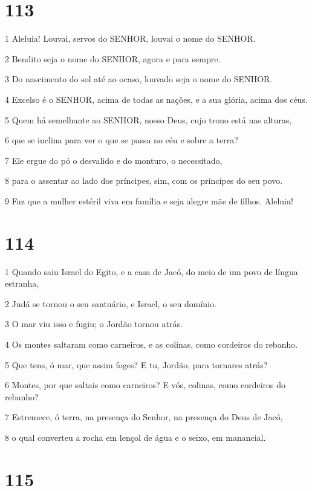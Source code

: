 \chapter{113}

\par 1 Aleluia! Louvai, servos do SENHOR, louvai o nome do SENHOR.
\par 2 Bendito seja o nome do SENHOR, agora e para sempre.
\par 3 Do nascimento do sol até ao ocaso, louvado seja o nome do SENHOR.
\par 4 Excelso é o SENHOR, acima de todas as nações, e a sua glória, acima dos céus.
\par 5 Quem há semelhante ao SENHOR, nosso Deus, cujo trono está nas alturas,
\par 6 que se inclina para ver o que se passa no céu e sobre a terra?
\par 7 Ele ergue do pó o desvalido e do monturo, o necessitado,
\par 8 para o assentar ao lado dos príncipes, sim, com os príncipes do seu povo.
\par 9 Faz que a mulher estéril viva em família e seja alegre mãe de filhos. Aleluia!

\chapter{114}

\par 1 Quando saiu Israel do Egito, e a casa de Jacó, do meio de um povo de língua estranha,
\par 2 Judá se tornou o seu santuário, e Israel, o seu domínio.
\par 3 O mar viu isso e fugiu; o Jordão tornou atrás.
\par 4 Os montes saltaram como carneiros, e as colinas, como cordeiros do rebanho.
\par 5 Que tens, ó mar, que assim foges? E tu, Jordão, para tornares atrás?
\par 6 Montes, por que saltais como carneiros? E vós, colinas, como cordeiros do rebanho?
\par 7 Estremece, ó terra, na presença do Senhor, na presença do Deus de Jacó,
\par 8 o qual converteu a rocha em lençol de água e o seixo, em manancial.

\chapter{115}

